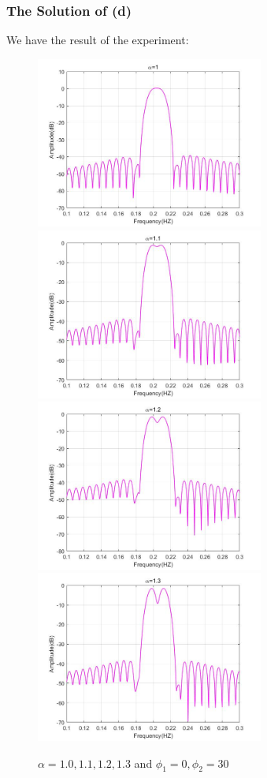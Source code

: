 \documentclass[UTF-8, a4paper, 12pt]{ctexart}
\begin{document}
\subsubsection{The Solution of (d)}
We have the result of the experiment:
\begin{figure}[htbp]
    \centering
    
    \includegraphics[width=7.5cm]{2/b10.jpg}
    \includegraphics[width=7.5cm]{2/b11.jpg}
    \includegraphics[width=7.5cm]{2/b12.jpg}
    \includegraphics[width=7.5cm]{2/b13.jpg}
    \caption{$\alpha=  1.0,1.1,1.2,1.3$ and $\phi_1=0, \phi_2=30$}
\end{figure}
\end{document}
